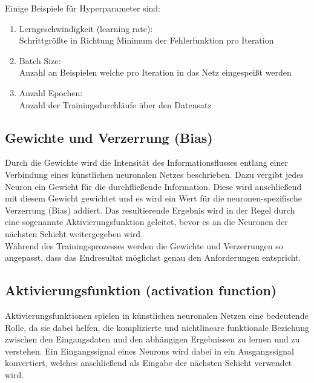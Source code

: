 Einige Beispiele für Hyperparameter sind:

\begin{enumerate}
	\item Lerngeschwindigkeit (learning rate):\\
	Schrittgrößte in Richtung Minimum der Fehlerfunktion pro Iteration 
	\item Batch Size:\\
	Anzahl an Beispielen welche pro Iteration in das Netz eingespeißt werden
	\item Anzahl Epochen:\\
	Anzahl der Trainingsdurchläufe über den Datensatz
\end{enumerate}
	
\subsection{Gewichte und Verzerrung (Bias)}

	Durch die Gewichte wird die Intensität des Informationsflusses entlang einer Verbindung eines künstlichen neuronalen Netzes beschrieben. Dazu vergibt jedes Neuron ein Gewicht für die durchfließende Information. Diese wird anschließend mit diesem Gewicht gewichtet und es wird ein Wert für die neuronen-spezifische Verzerrung (Bias) addiert. Das resultierende Ergebnis wird in der Regel durch eine sogenannte Aktivierungsfunktion geleitet, bevor es an die Neuronen der nächsten Schicht weitergegeben wird. \cite{jaai} \\
	
	Während des Trainingsprozesses werden die Gewichte und Verzerrungen so angepasst, dass das Endresultat möglichst genau den Anforderungen entspricht. \cite{jaai}
	
\subsection{Aktivierungsfunktion (activation function)}

	Aktivierungsfunktionen spielen in künstlichen neuronalen Netzen eine bedeutende Rolle, da sie dabei helfen, die komplizierte und nichtlineare funktionale Beziehung zwischen den Eingangsdaten und den abhängigen Ergebnissen zu lernen und zu verstehen. Ein Eingangssignal eines Neurons wird dabei in ein Ausgangssignal konvertiert, welches anschließend als Eingabe der nächsten Schicht verwendet wird. \cite{ai-united} \\
	
